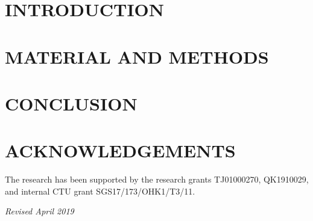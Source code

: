\documentclass{isprs} %
\begin{document}

\maketitle


\section{INTRODUCTION}\label{INTRODUCTION}
 
\sloppy



\section{MATERIAL AND METHODS}\label{sec:mat_met}







\section{CONCLUSION}



\section*{ACKNOWLEDGEMENTS}\label{ACKNOWLEDGEMENTS}
The research has been supported by the research grants TJ01000270,
QK1910029, and internal CTU grant SGS17/173/OHK1/T3/11.

{
  \begin{spacing}{1.17}
    \normalsize
  \end{spacing}
}

\vspace{1cm}
\textit{Revised April 2019}
\end{document}
